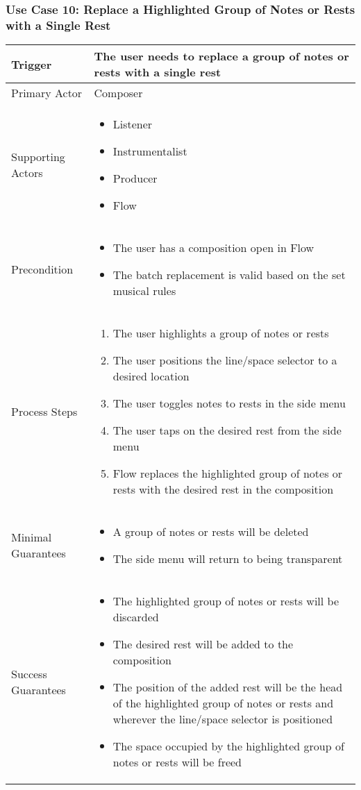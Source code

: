 \subsubsection{Use Case 10: Replace a Highlighted Group of Notes or Rests with a Single Rest}

\begin{tabularx}{\textwidth}{|X|X|}
\hline
Trigger & 
The user needs to replace a group of notes or rests with a single rest \\
\hline
Primary Actor & 
Composer \\
\hline
Supporting Actors & 
\begin{itemize}
\item Listener
\item Instrumentalist
\item Producer
\item Flow
\end{itemize} \\
\hline
Precondition & 
\begin{itemize}
\item The user has a composition open in Flow
\item The batch replacement is valid based on the set musical rules
\end{itemize} \\
\hline
Process Steps & 
\begin{enumerate}
\item The user highlights a group of notes or rests
\item The user positions the line/space selector to a desired location
\item The user toggles notes to rests in the side menu
\item The user taps on the desired rest from the side menu
\item Flow replaces the highlighted group of notes or rests with the desired rest in the composition
\end{enumerate} \\
\hline
Minimal Guarantees & 
\begin{itemize}
  \item A group of notes or rests will be deleted
  \item The side menu will return to being transparent
\end{itemize} \\
\hline
Success Guarantees & 
\begin{itemize}
  \item The highlighted group of notes or rests will be discarded
  \item The desired rest will be added to the composition
  \item The position of the added rest will be the head of the highlighted group of notes or rests and wherever the line/space selector is positioned 
  \item The space occupied by the highlighted group of notes or rests will be freed
\end{itemize} \\
\hline
\end{tabularx}

